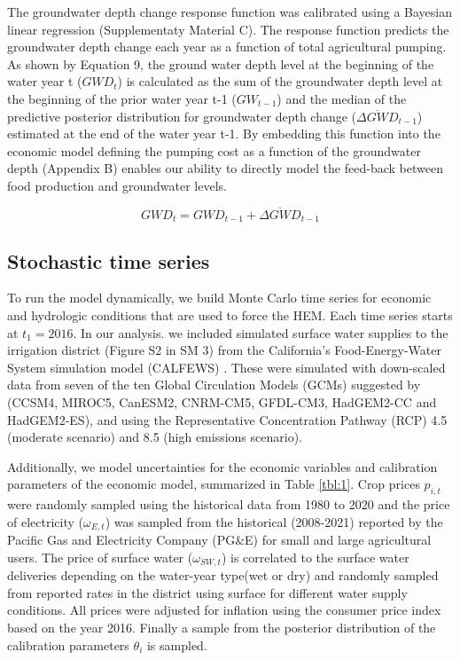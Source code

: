 \documentclass[a4paper,fleqn]{cas-sc}
\begin{document}
The groundwater depth change response function was calibrated using a Bayesian linear regression (Supplementaty Material C). The response function predicts the groundwater depth change each year as a function of total agricultural pumping. As shown by Equation 9, the ground water depth level at the beginning of the water year t ($GWD_{t}$) is calculated as the sum of the groundwater depth level at the beginning of the prior water year t-1 ($GW_{t-1}$)  and the median of the predictive posterior distribution for groundwater depth change ($\overline{\Delta GWD}_{t-1}$) estimated at the end of the water year t-1. By embedding this function into the economic model defining the pumping cost as a function of the groundwater depth (Appendix B) enables our ability to directly model the feed-back between food production and groundwater levels. 

\begin{equation}
GWD_{t} = GWD_{t-1} + \overline{\Delta GWD}_{t-1}
\end{equation}

\subsection{Stochastic time series}\label{sct:2.2}

To run the model dynamically, we build Monte Carlo time series for economic and hydrologic conditions that are used to force the HEM. Each time series starts at $t_{1}=2016$. In our analysis. we included simulated surface water supplies to the irrigation district (Figure S2 in SM 3) from the California’s Food-Energy-Water System simulation model (CALFEWS) \citep{zeff_californias_2021}. These were simulated with down-scaled data from seven of the ten Global Circulation Models (GCMs) suggested by \citet{pierce_climate_2018} (CCSM4, MIROC5, CanESM2, CNRM-CM5, GFDL-CM3, HadGEM2-CC and HadGEM2-ES), and using the Representative Concentration Pathway (RCP) 4.5 (moderate scenario) and 8.5 (high emissions scenario). 

Additionally, we model uncertainties for the economic variables and calibration parameters of the economic model, summarized in Table \ref{tbl:1}. Crop prices $p_{i,t}$ were randomly sampled using the historical data from 1980 to 2020 \citep{usda_national_2020} and the price of electricity ($\omega_{E,t}$) was sampled from the historical (2008-2021) reported by the Pacific Gas and Electricity Company (PG\&E) for small and large agricultural users. The price of surface water ($\omega_{SW,t}$) is correlated to the surface water deliveries depending on the water-year type(wet or dry) and randomly sampled from reported rates in the district using surface for different water supply conditions. All prices were adjusted for inflation using the consumer price index based on the year 2016. Finally a sample from the posterior distribution of the calibration parameters $\theta_{i}$ is sampled.
\end{document}
